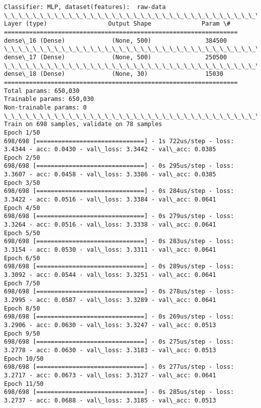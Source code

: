 \documentclass[11pt]{article}
\begin{document}
    \begin{Verbatim}[commandchars=\\\{\}]
Classifier: MLP, dataset(features):  raw-data
\_\_\_\_\_\_\_\_\_\_\_\_\_\_\_\_\_\_\_\_\_\_\_\_\_\_\_\_\_\_\_\_\_\_\_\_\_\_\_\_\_\_\_\_\_\_\_\_\_\_\_\_\_\_\_\_\_\_\_\_\_\_\_\_\_
Layer (type)                 Output Shape              Param \#   
=================================================================
dense\_16 (Dense)             (None, 500)               384500    
\_\_\_\_\_\_\_\_\_\_\_\_\_\_\_\_\_\_\_\_\_\_\_\_\_\_\_\_\_\_\_\_\_\_\_\_\_\_\_\_\_\_\_\_\_\_\_\_\_\_\_\_\_\_\_\_\_\_\_\_\_\_\_\_\_
dense\_17 (Dense)             (None, 500)               250500    
\_\_\_\_\_\_\_\_\_\_\_\_\_\_\_\_\_\_\_\_\_\_\_\_\_\_\_\_\_\_\_\_\_\_\_\_\_\_\_\_\_\_\_\_\_\_\_\_\_\_\_\_\_\_\_\_\_\_\_\_\_\_\_\_\_
dense\_18 (Dense)             (None, 30)                15030     
=================================================================
Total params: 650,030
Trainable params: 650,030
Non-trainable params: 0
\_\_\_\_\_\_\_\_\_\_\_\_\_\_\_\_\_\_\_\_\_\_\_\_\_\_\_\_\_\_\_\_\_\_\_\_\_\_\_\_\_\_\_\_\_\_\_\_\_\_\_\_\_\_\_\_\_\_\_\_\_\_\_\_\_
Train on 698 samples, validate on 78 samples
Epoch 1/50
698/698 [==============================] - 1s 722us/step - loss: 3.4344 - acc: 0.0430 - val\_loss: 3.3442 - val\_acc: 0.0385
Epoch 2/50
698/698 [==============================] - 0s 295us/step - loss: 3.3607 - acc: 0.0458 - val\_loss: 3.3386 - val\_acc: 0.0385
Epoch 3/50
698/698 [==============================] - 0s 284us/step - loss: 3.3422 - acc: 0.0516 - val\_loss: 3.3384 - val\_acc: 0.0641
Epoch 4/50
698/698 [==============================] - 0s 279us/step - loss: 3.3264 - acc: 0.0516 - val\_loss: 3.3338 - val\_acc: 0.0641
Epoch 5/50
698/698 [==============================] - 0s 283us/step - loss: 3.3154 - acc: 0.0530 - val\_loss: 3.3311 - val\_acc: 0.0641
Epoch 6/50
698/698 [==============================] - 0s 289us/step - loss: 3.3092 - acc: 0.0544 - val\_loss: 3.3251 - val\_acc: 0.0641
Epoch 7/50
698/698 [==============================] - 0s 278us/step - loss: 3.2995 - acc: 0.0587 - val\_loss: 3.3289 - val\_acc: 0.0641
Epoch 8/50
698/698 [==============================] - 0s 269us/step - loss: 3.2906 - acc: 0.0630 - val\_loss: 3.3247 - val\_acc: 0.0513
Epoch 9/50
698/698 [==============================] - 0s 275us/step - loss: 3.2778 - acc: 0.0630 - val\_loss: 3.3183 - val\_acc: 0.0513
Epoch 10/50
698/698 [==============================] - 0s 277us/step - loss: 3.2717 - acc: 0.0673 - val\_loss: 3.3127 - val\_acc: 0.0641
Epoch 11/50
698/698 [==============================] - 0s 285us/step - loss: 3.2737 - acc: 0.0688 - val\_loss: 3.3185 - val\_acc: 0.0513

\end{Verbatim}
\end{document}
